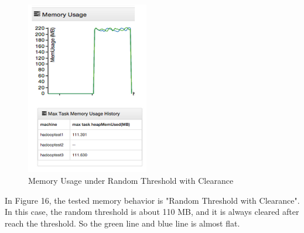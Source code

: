 \begin{figure}[ht]
  \centering
    \includegraphics[width=2.1in]{image/test1d.png}
    \caption{Memory Usage under Random Threshold with Clearance}
    \label{ref:test1d}
\end{figure}

In Figure 16, the tested memory behavior is "Random Threshold with Clearance". In this case, the random threshold is about 110 MB, and it is always cleared after reach the threshold. So the green line and blue line is almost flat.
